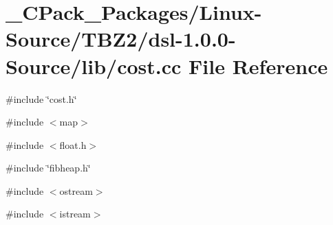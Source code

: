 \section{\_\-CPack\_\-Packages/Linux-\/Source/TBZ2/dsl-\/1.0.0-\/Source/lib/cost.cc File Reference}
\label{__CPack__Packages_2Linux-Source_2TBZ2_2dsl-1_80_80-Source_2lib_2cost_8cc}
{\ttfamily \#include \char`\"{}cost.h\char`\"{}}\par
{\ttfamily \#include $<$map$>$}\par
{\ttfamily \#include $<$float.h$>$}\par
{\ttfamily \#include \char`\"{}fibheap.h\char`\"{}}\par
{\ttfamily \#include $<$ostream$>$}\par
{\ttfamily \#include $<$istream$>$}\par
